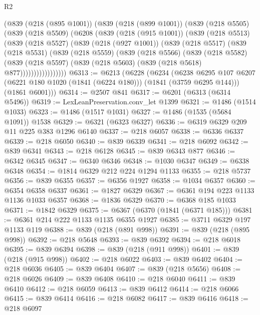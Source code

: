 \begin{lexlean}{R2}
\begin{coremodule}
    (@839
      (@218 (@895 @1001))
      (@839
        (@218 (@899 @1001))
        (@839
          (@218 @5505)
          (@839
            (@218 @5509)
            (@6208
              (@839
                (@218 (@915 @1001))
                (@839
                  (@218 @5513)
                  (@839
                    (@218 @5527)
                    (@839
                      (@218 (@927 @1001))
                      (@839
                        (@218 @5517)
                        (@839
                          (@218 @5531)
                          (@839
                            (@218 @5559)
                            (@839
                              (@218 @5566)
                              (@839
                                (@218 @5582)
                                (@839
                                  (@218 @5597)
                                  (@839 (@218 @5603) (@839 (@218 @5618) @877)))))))))))))))))
@6313 := @6213
    (@6228
      (@6234
        (@6238 @6295 @107 @6207 (@6221 @180 @1020 (@1841 (@6224 @180))) (@1841 (@3759 @6295 @144)))
        (@1861 @6001)))
@6314 := @2507 @841
@6317 := @6201 (@6313 (@6314 @5496))
@6319 := LexLeanPreservation.conv_let @1399
@6321 := @1486 (@1514 @1033)
@6323 := @1486 (@1517 @1031)
@6327 := @1486 (@1535 (@5684 @1091)) @1538
@6329 := @6321 (@6323 @6327)
@6336 := @6319 @6329 @209 @11 @225 @383 @1296 @6140
@6337 := @218 @6057
@6338 := @6336 @6337
@6339 := @218 @6050
@6340 := @839 @6339
@6341 := @218 @6092
@6342 := @839 @6341
@6343 := @218 @6128
@6345 := @839 @6343 @877
@6346 := @6342 @6345
@6347 := @6340 @6346
@6348 := @1030 @6347
@6349 := @6338 @6348
@6354 := @1814 @6329 @212 @224 @1294 @1133
@6355 := @218 @5737
@6356 := @839 @6355
@6357 := @6356 @1927
@6358 := @1034 @6357
@6360 := @6354 @6358 @6337
@6361 := @1827 @6329
@6367 := @6361 @194 @223 @1133 @1136 @1033 @6357
@6368 := @1836 @6329
@6370 := @6368 @185 @1033
@6371 := @1842 @6329
@6375 := @6367 (@6370 (@1841 (@6371 @185)))
@6381 := @6361 @214 @222 @1133 @1135 @6355 @1927
@6385 := @3711 @6329 @197 @1133 @119
@6388 := @839 (@218 (@891 @998))
@6391 := @839 (@218 (@895 @998))
@6392 := @218 @5648
@6393 := @839 @6392
@6394 := @218 @6018
@6395 := @839 @6394
@6398 := @839 (@218 (@911 @998))
@6401 := @839 (@218 (@915 @998))
@6402 := @218 @6022
@6403 := @839 @6402
@6404 := @218 @6036
@6405 := @839 @6404
@6407 := @839 (@218 @5656)
@6408 := @218 @6026
@6409 := @839 @6408
@6410 := @218 @6040
@6411 := @839 @6410
@6412 := @218 @6059
@6413 := @839 @6412
@6414 := @218 @6066
@6415 := @839 @6414
@6416 := @218 @6082
@6417 := @839 @6416
@6418 := @218 @6097

\end{coremodule}
\end{lexlean}
